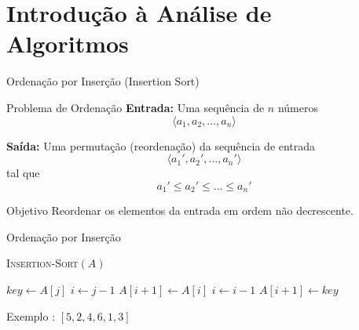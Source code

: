\documentclass{beamer}
\newcommand{\og}[1]{\textcolor{rsOrange}{#1}}
\begin{document}
\section{Introdução à Análise de Algoritmos}
\begin{frame}{Ordenação por Inserção (Insertion Sort)}

\begin{block}{Problema de Ordenação}
\textbf{Entrada:}  
Uma sequência de $n$ números  
\[
\langle a_1, a_2, \dots, a_n \rangle
\]

\vspace{0.3cm}

\textbf{Saída:}  
Uma permutação (reordenação) da sequência de entrada  
\[
\langle a_1', a_2', \dots, a_n' \rangle
\]
tal que  
\[
a_1' \leq a_2' \leq \dots \leq a_n'
\]

\end{block}

\vspace{0.3cm}

\begin{alertblock}{Objetivo}
Reordenar os elementos da entrada em ordem não decrescente.
\end{alertblock}

\end{frame}
\begin{frame}{Ordenação por Inserção}

\begin{block}{\textsc{Insertion-Sort}$(A)$}
\begin{algorithmic}[1]
    \State $key \gets A[j]$
    \State {}
    \State $i \gets j - 1$
        \State $A[i + 1] \gets A[i]$
        \State $i \gets i - 1$
    \EndWhile
    \State $A[i + 1] \gets key$
\EndFor
\end{algorithmic}
\end{block}

\og{Exemplo} : $[5,2,4,6,1,3]$

\end{frame}
\end{document}
